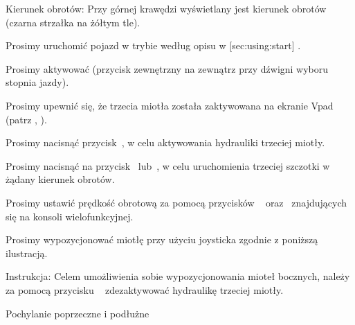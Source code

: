 {\md Kierunek obrotów:} {\lt Przy górnej krawędzi wyświetlany jest kierunek obrotów (czarna strzałka na żółtym tle).}
\stopSymVpad

\stopsection






\startsection [title={Praca z trzecią miotłą (opcja)},
reference={sec:using:frontBrush},
]

\startSteps
\item Prosimy uruchomić pojazd w trybie  według opisu w [sec:using:start] .
\item Prosimy aktywować  (przycisk zewnętrzny na zewnątrz przy dźwigni wyboru stopnia jazdy).
\stopSteps


\startSteps [continue]
\item Prosimy upewnić się, że trzecia miotła została zaktywowana na ekranie Vpad (patrz  , ).
\item Prosimy nacisnąć przycisk~, w celu aktywowania hydrauliki trzeciej miotły.
\item Prosimy nacisnąć na przycisk~ lub~, w celu uruchomienia trzeciej szczotki w żądany kierunek obrotów.

\item Prosimy ustawić prędkość obrotową za pomocą przycisków ~ oraz~ znajdujących się na konsoli wielofunkcyjnej.

\item Prosimy wypozycjonować miotłę przy użyciu joysticka zgodnie z poniższą ilustracją.

\stopSteps

{\md Instrukcja:} {\lt Celem umożliwienia sobie wypozycjonowania mioteł bocznych, należy za pomocą przycisku ~ zdezaktywować hydraulikę trzeciej miotły.}
\vfill

\start
\setupcombinations [width=\textwidth]

{
{}{Pochylanie poprzeczne i podłużne}
\stopcombination}
\stop



